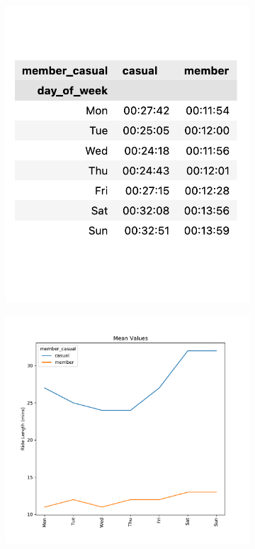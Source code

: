\documentclass[12pt]{article}
\begin{document}
\begin{itemize}
	\begin{figure}[h]
	\hspace{0.8in}
	\begin{subfigure}{.2\textwidth}
		\includegraphics[scale=0.6]{dayofweek_t.png} 
		\caption{}
		\label{fig14_1}
	\end{subfigure}
	\begin{subfigure}{.55\textwidth}
	\hspace{1.2in}
		\includegraphics[scale=0.48]{mean_cvsm_dayofweek.pdf} 

\end{subfigure}
\end{figure}
\end{itemize}
\end{document}
